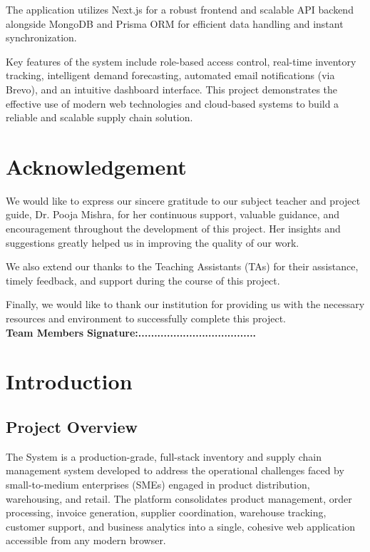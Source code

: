 \documentclass[12pt,a4paper]{report}
\begin{document}
The application utilizes Next.js for a robust frontend and scalable API backend alongside MongoDB and Prisma ORM for efficient data handling and instant synchronization. 

Key features of the system include role-based access control, real-time inventory tracking, intelligent demand forecasting, automated email notifications (via Brevo), and an intuitive dashboard interface. This project demonstrates the effective use of modern web technologies and cloud-based systems to build a reliable and scalable supply chain solution.
\newpage


\chapter*{Acknowledgement}
We would like to express our sincere gratitude to our subject teacher and project guide, Dr. Pooja Mishra, for her continuous support, valuable guidance, and encouragement throughout the development of this project. Her insights and suggestions greatly helped us in improving the quality of our work.

We also extend our thanks to the Teaching Assistants (TAs) for their assistance, timely feedback, and support during the course of this project.

Finally, we would like to thank our institution for providing us with the necessary resources and environment to successfully complete this project.\\[2cm]

\noindent
\textbf{Team Members} \hfill \textbf{Signature:.....................................}
\newpage

\tableofcontents
\newpage

\chapter{Introduction}

\section{Project Overview}

The System is a production-grade, full-stack inventory and supply chain management system developed to address the operational challenges faced by small-to-medium enterprises (SMEs) engaged in product distribution, warehousing, and retail. The platform consolidates product management, order processing, invoice generation, supplier coordination, warehouse tracking, customer support, and business analytics into a single, cohesive web application accessible from any modern browser.
\end{document}
